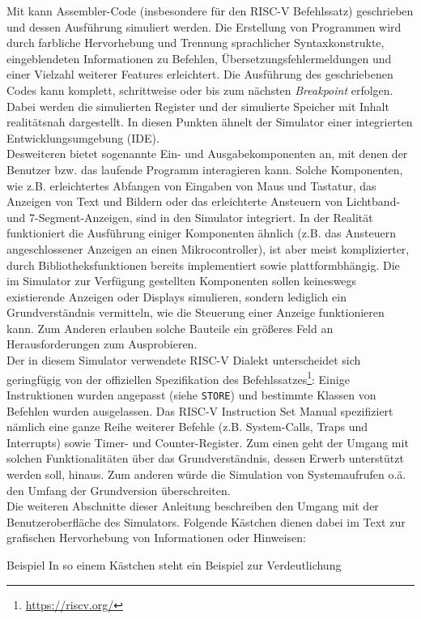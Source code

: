 Mit \erasim{} kann Assembler-Code (insbesondere für den RISC-V Befehlssatz)
geschrieben und dessen Ausführung simuliert werden. Die Erstellung von
Programmen wird durch farbliche Hervorhebung und Trennung sprachlicher
Syntaxkonstrukte, eingeblendeten Informationen zu Befehlen,
Übersetzungsfehlermeldungen und einer Vielzahl weiterer Features erleichtert.
Die Ausführung des geschriebenen Codes kann komplett, schrittweise oder bis zum
nächsten \emph{Breakpoint} erfolgen. Dabei werden die simulierten Register und
der simulierte Speicher mit Inhalt realitätsnah dargestellt. In diesen Punkten
ähnelt der Simulator einer integrierten Entwicklungsumgebung (IDE).\\
Desweiteren bietet \erasim{} sogenannte Ein- und Ausgabekomponenten an, mit denen
der Benutzer bzw. das laufende Programm interagieren kann. Solche Komponenten,
wie z.B. erleichtertes Abfangen von Eingaben von Maus und Tastatur, das Anzeigen
von Text und Bildern oder das erleichterte Ansteuern von Lichtband- und
7-Segment-Anzeigen, sind in den Simulator integriert. In der Realität
funktioniert die Ausführung einiger Komponenten ähnlich (z.B. das Ansteuern
angeschlossener Anzeigen an einen Mikrocontroller), ist aber meist
komplizierter, durch Bibliotheksfunktionen bereits implementiert sowie
plattformbhängig. Die im Simulator zur Verfügung gestellten Komponenten sollen
keineswegs existierende Anzeigen oder Displays simulieren, sondern lediglich ein
Grundverständnis vermitteln, wie die Steuerung einer Anzeige funktionieren kann.
Zum Anderen erlauben solche Bauteile ein größeres Feld an Herausforderungen zum
Ausprobieren.\\ Der in diesem Simulator verwendete RISC-V Dialekt unterscheidet
sich geringfügig von der offiziellen Spezifikation des
Befehlssatzes\footnote{\url{https://riscv.org/}}: Einige Instruktionen wurden
angepasst (siehe \texttt{STORE}) und bestimmte Klassen von Befehlen wurden
ausgelassen. Das RISC-V Instruction Set Manual spezifiziert nämlich eine ganze
Reihe weiterer Befehle (z.B. System-Calls, Traps und Interrupts) sowie Timer-
und Counter-Register. Zum einen geht der Umgang mit solchen Funktionalitäten
über das Grundverständnis, dessen Erwerb unterstützt werden soll, hinaus. Zum
anderen würde die Simulation von Systemaufrufen o.ä. den Umfang der Grundversion
überschreiten.\\

Die weiteren Abschnitte dieser Anleitung beschreiben den Umgang mit der
Benutzeroberfläche des Simulators. Folgende Kästchen dienen dabei im Text zur
grafischen Hervorhebung von Informationen oder Hinweisen:
\begin{exampleblock}{Beispiel}
	In so einem Kästchen steht ein Beispiel zur Verdeutlichung
\end{exampleblock}

